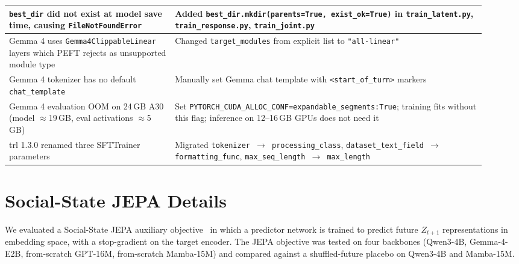 \documentclass[11pt]{article}
\begin{document}
\begin{table}[h]
\begin{tabular}{@{}p{0.32\linewidth}p{0.60\linewidth}@{}}
\midrule
\texttt{best\_dir} did not exist at model save time, causing \texttt{FileNotFoundError} & Added \texttt{best\_dir.mkdir(parents=True, exist\_ok=True)} in \texttt{train\_latent.py}, \texttt{train\_response.py}, \texttt{train\_joint.py} \\
\midrule
Gemma 4 uses \texttt{Gemma4ClippableLinear} layers which PEFT rejects as unsupported module type & Changed \texttt{target\_modules} from explicit list to \texttt{"all-linear"} \\
\midrule
Gemma 4 tokenizer has no default \texttt{chat\_template} & Manually set Gemma chat template with \texttt{<start\_of\_turn>} markers \\
\midrule
Gemma 4 evaluation OOM on 24\,GB A30 (model $\approx$19\,GB, eval activations $\approx$5\,GB) & Set \texttt{PYTORCH\_CUDA\_ALLOC\_CONF=expandable\_segments:True}; training fits without this flag; inference on 12--16\,GB GPUs does not need it \\
\midrule
trl 1.3.0 renamed three SFTTrainer parameters & Migrated \texttt{tokenizer $\rightarrow$ processing\_class}, \texttt{dataset\_text\_field $\rightarrow$ formatting\_func}, \texttt{max\_seq\_length $\rightarrow$ max\_length} \\
\bottomrule
\end{tabular}
\end{table}

\section{Social-State JEPA Details}
\label{app:jepa}

We evaluated a Social-State JEPA auxiliary objective~\cite{lecun2022path,assran2023self} in which a predictor network is trained to predict future $Z_{t+1}$ representations in embedding space, with a stop-gradient on the target encoder.
The JEPA objective was tested on four backbones (Qwen3-4B, Gemma-4-E2B, from-scratch GPT-16M, from-scratch Mamba-15M) and compared against a shuffled-future placebo on Qwen3-4B and Mamba-15M.
\end{document}
